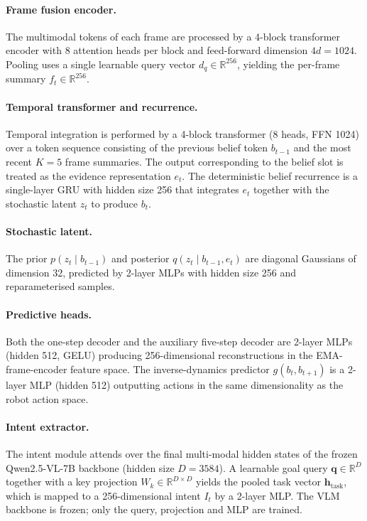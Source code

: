 \documentclass[12pt]{article}
\begin{document}
\paragraph{Frame fusion encoder.} The multimodal tokens of each frame are processed by a 4-block transformer encoder with 8 attention heads per block and feed-forward dimension $4d = 1024$. Pooling uses a single learnable query vector $d_q \in \mathbb{R}^{256}$, yielding the per-frame summary $f_t \in \mathbb{R}^{256}$.

\paragraph{Temporal transformer and recurrence.} Temporal integration is performed by a 4-block transformer (8 heads, FFN 1024) over a token sequence consisting of the previous belief token $b_{t-1}$ and the most recent $K = 5$ frame summaries. The output corresponding to the belief slot is treated as the evidence representation $e_t$. The deterministic belief recurrence is a single-layer GRU with hidden size 256 that integrates $e_t$ together with the stochastic latent $z_t$ to produce $b_t$.

\paragraph{Stochastic latent.} The prior $p(z_t \mid b_{t-1})$ and posterior $q(z_t \mid b_{t-1}, e_t)$ are diagonal Gaussians of dimension 32, predicted by 2-layer MLPs with hidden size 256 and reparameterised samples.

\paragraph{Predictive heads.} Both the one-step decoder and the auxiliary five-step decoder are 2-layer MLPs (hidden 512, GELU) producing 256-dimensional reconstructions in the EMA-frame-encoder feature space. The inverse-dynamics predictor $g(b_t, b_{t+1})$ is a 2-layer MLP (hidden 512) outputting actions in the same dimensionality as the robot action space.

\paragraph{Intent extractor.} The intent module attends over the final multi-modal hidden states of the frozen Qwen2.5-VL-7B \cite{bai2025qwen2} backbone (hidden size $D = 3584$). A learnable goal query $\mathbf{q} \in \mathbb{R}^{D}$ together with a key projection $W_k \in \mathbb{R}^{D \times D}$ yields the pooled task vector $\mathbf{h}_{\text{task}}$, which is mapped to a 256-dimensional intent $I_t$ by a 2-layer MLP. The VLM backbone is frozen; only the query, projection and MLP are trained.
\end{document}

